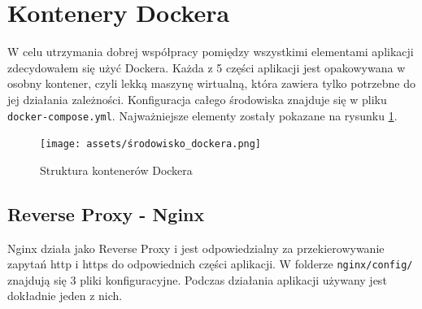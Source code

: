 \documentclass[shortabstract]{iithesis}
\begin{document}
\section{Kontenery Dockera}
W celu utrzymania dobrej współpracy pomiędzy wszystkimi elementami aplikacji zdecydowałem się użyć Dockera\cite{Docker}.
Każda z 5 części aplikacji jest opakowywana w osobny kontener, czyli lekką maszynę wirtualną, która zawiera tylko potrzebne do jej działania zależności.
Konfiguracja całego środowiska znajduje się w pliku \texttt{docker-compose.yml}. Najważniejsze elementy zostały pokazane na rysunku \ref{fig:docker_containers_environment}.

\begin{figure}[H]
    \centering
    \texttt{[image: assets/środowisko\_dockera.png]}
    \caption{Struktura kontenerów Dockera}
    \label{fig:docker_containers_environment}
\end{figure}

\subsection{Reverse Proxy - Nginx}
Nginx\cite{Nginx} działa jako Reverse Proxy i jest odpowiedzialny za przekierowywanie zapytań http i https do odpowiednich części aplikacji.
W folderze \texttt{nginx/config/} znajdują się 3 pliki konfiguracyjne. Podczas działania aplikacji używany jest dokładnie jeden z nich.
\end{document}
